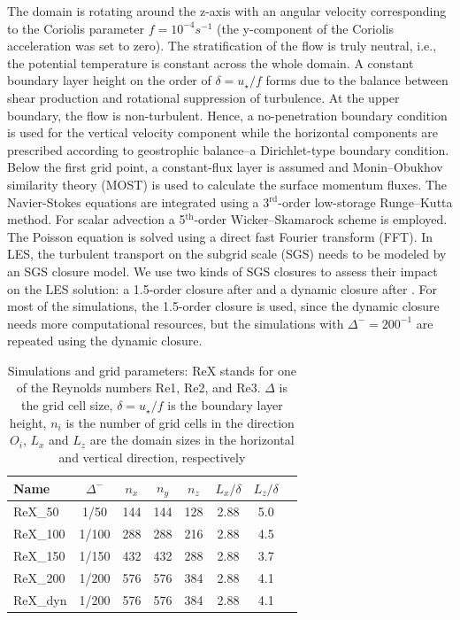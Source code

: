 \documentclass[smallcondensed,final]{svjour3}
\begin{document}
The domain is rotating around the z-axis with an angular velocity corresponding to the Coriolis parameter $f=10^{-4}s^{-1}$ (the y-component of the Coriolis acceleration was set to zero). The stratification of the flow is truly neutral, i.e., the potential temperature is constant across the whole domain. A constant boundary layer height on the order of $\delta=u_\star/f$ forms due to the balance between shear production and rotational suppression of turbulence. At the upper boundary, the flow is non-turbulent. Hence, a no-penetration boundary condition is used for the vertical velocity component while the horizontal components are prescribed according to geostrophic balance--a Dirichlet-type boundary condition. Below the first grid point, a constant-flux layer is assumed and Monin--Obukhov similarity theory (MOST) is used to calculate the surface momentum fluxes. The Navier-Stokes equations are integrated using a 3$^\text{rd}$-order low-storage Runge--Kutta method. For scalar advection a 5$^\text{th}$-order Wicker--Skamarock scheme is employed. The Poisson equation is solved using a direct fast Fourier transform (FFT). In LES, the turbulent transport on the subgrid scale (SGS) needs to be modeled by an SGS closure model. We use two kinds of SGS closures to assess their impact on the LES solution: a 1.5-order closure after \cite{deardorff1980stratocumulus} and a dynamic closure after \cite{heinz2008realizability}. For most of the simulations, the 1.5-order closure is used, since the dynamic closure needs more computational resources, but the simulations with $\Delta^-=200^{-1}$ are repeated using the dynamic closure.  

\begin{table}
	\centering
	\caption{Simulations and grid parameters: ReX stands for one of the Reynolds numbers Re1, Re2, and Re3. $\Delta$ is the grid cell size, $\delta=u_\star/f$ is the boundary layer height, $n_i$ is the number of grid cells in the direction $O_i$, $L_x$ and $L_z$ are the domain sizes in the horizontal and vertical direction, respectively}
	  \begin{tabular}{lccccccc}
          \toprule 
	    Name & $\Delta^-$ & $n_x$ & $n_y$ & $n_z$ & $L_x/\delta$ & $L_z/\delta$  \\ 
          \midrule
  	  ReX\_50 & 1/50 & 144 & 144 & 128 & 2.88 & 5.0 \\
  	  ReX\_100 & 1/100 & 288 & 288 & 216 & 2.88 & 4.5 \\
	    ReX\_150 & 1/150 & 432 & 432 & 288 & 2.88 & 3.7 \\
  	  ReX\_200 & 1/200 & 576 & 576 & 384 & 2.88 & 4.1 \\
  	  ReX\_dyn & 1/200 & 576 & 576 & 384 & 2.88 & 4.1 \\
           \bottomrule
		\end{tabular}
	\label{simulation_parameters2}
\end{table}
\end{document}
